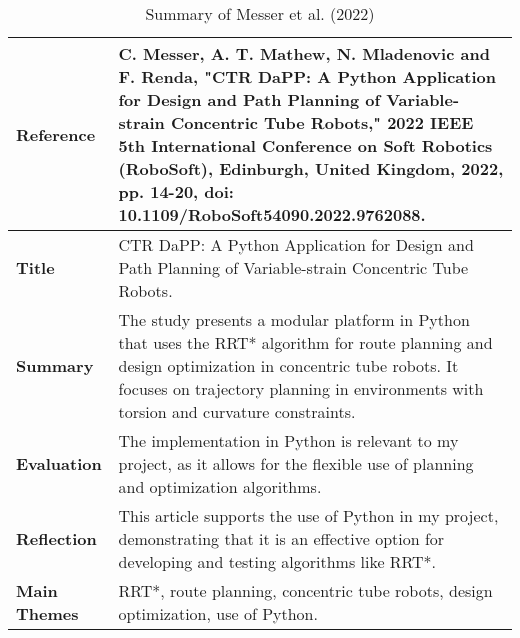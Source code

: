 \documentclass[a4paper,12pt]{report}
\begin{document}
\begin{table}[H]
    \centering
    \begin{tabular}{|p{3cm}|p{10cm}|}
        \hline
        \textbf{Reference} & C. Messer, A. T. Mathew, N. Mladenovic and F. Renda, "CTR DaPP: A Python Application for Design and Path Planning of Variable-strain Concentric Tube Robots," 2022 IEEE 5th International Conference on Soft Robotics (RoboSoft), Edinburgh, United Kingdom, 2022, pp. 14-20, doi: 10.1109/RoboSoft54090.2022.9762088. \\ \hline
        \textbf{Title} & CTR DaPP: A Python Application for Design and Path Planning of Variable-strain Concentric Tube Robots. \\ \hline
        \textbf{Summary} & The study presents a modular platform in Python that uses the RRT* algorithm for route planning and design optimization in concentric tube robots. It focuses on trajectory planning in environments with torsion and curvature constraints. \\ \hline
        \textbf{Evaluation} & The implementation in Python is relevant to my project, as it allows for the flexible use of planning and optimization algorithms. \\ \hline
        \textbf{Reflection} & This article supports the use of Python in my project, demonstrating that it is an effective option for developing and testing algorithms like RRT*. \\ \hline
        \textbf{Main Themes} & RRT*, route planning, concentric tube robots, design optimization, use of Python. \\ \hline
    \end{tabular}
    \caption{Summary of Messer et al. (2022)}
    \label{tab:messer2022}
\end{table}
\end{document}
